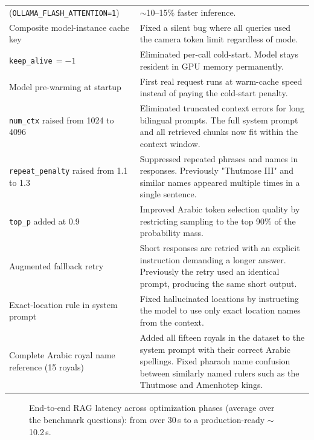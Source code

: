 \begin{longtable}[c]{@{}>{\raggedright\arraybackslash}p{}p{}@{}}
(\texttt{OLLAMA\_\allowbreak FLASH\_\allowbreak ATTENTION=1})		& $\sim$10--15\% faster inference.\\
Composite model-instance cache key			& Fixed a silent bug where all queries used the camera token limit regardless of mode.\\
\texttt{keep\_alive}\,$=-1$					& Eliminated per-call cold-start. Model stays resident in GPU memory permanently.\\
Model pre-warming at startup				& First real request runs at warm-cache speed instead of paying the cold-start penalty.\\
\texttt{num\_ctx} raised from 1024 to 4096	& Eliminated truncated context errors for long bilingual prompts. The full system prompt and all retrieved chunks now fit within the context window.\\
\texttt{repeat\_penalty}
raised from 1.1 to 1.3						& Suppressed repeated phrases and names in responses. Previously "Thutmose III" and similar names appeared multiple times in a single sentence.\\
\texttt{top\_p} added at 0.9				& Improved Arabic token selection quality by restricting sampling to the top 90\% of the probability mass.\\
Augmented fallback retry					& Short responses are retried with an explicit instruction demanding a longer answer. Previously the retry used an identical prompt, producing the same short output.\\
Exact-location rule in system prompt		& Fixed hallucinated locations by instructing the model to use only exact location names from the context.\\
Complete Arabic royal name reference
(15 royals)									& Added all fifteen royals in the dataset to the system prompt with their correct Arabic spellings. Fixed pharaoh name confusion between similarly named rulers such as the Thutmose and Amenhotep kings.\\
\end{longtable}

\begin{figure}[htbp]
\centering
{}
\caption{End-to-end RAG latency across optimization phases (average over the
benchmark questions): from over 30\,s to a production-ready $\sim$10.2\,s.}
\label{fig:latency}
\end{figure}

